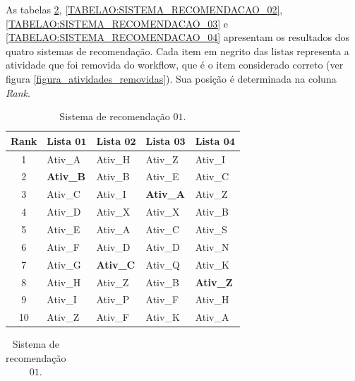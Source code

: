 As tabelas \ref{TABELAO:SISTEMA_RECOMENDACAO_01}, \ref{TABELAO:SISTEMA_RECOMENDACAO_02}, \ref{TABELAO:SISTEMA_RECOMENDACAO_03} e \ref{TABELAO:SISTEMA_RECOMENDACAO_04} apresentam os resultados dos quatro sistemas de recomendação. Cada item em negrito das listas representa a atividade que foi removida do workflow, que é o item considerado correto (ver figura \ref{figura_atividades_removidas}). Sua posição é determinada na coluna \emph{Rank}.
\begin{table}[!htbp]
\tiny
 \caption{Exemplo de recomendações de atividades usando quatro sistemas de recomendação.}
   \begin{subtable}{.5\linewidth}
    	\centering
   		\begin{tabular}{cllll} \hline 
   		\textbf{Rank} & \textbf{Lista} \(\mathbf{01}\) & \textbf{Lista} \(\mathbf{02}\) & \textbf{Lista} \(\mathbf{03}\) & \textbf{Lista} \(\mathbf{04}\) \\ \hline 
   		1                & Ativ\_A	     		& Ativ\_H    			& Ativ\_Z   		& Ativ\_I    		\\
   		2                & \textbf{Ativ\_B}		& Ativ\_B   			& Ativ\_E   		& Ativ\_C 			\\
   		3                & Ativ\_C    			& Ativ\_I    			& \textbf{Ativ\_A}  & Ativ\_Z  			\\
   		4                & Ativ\_D   			& Ativ\_X    			& Ativ\_X    		& Ativ\_B			\\
   		5                & Ativ\_E   			& Ativ\_A			 	& Ativ\_C    		& Ativ\_S			\\
   		6                & Ativ\_F   			& Ativ\_D    			& Ativ\_D    		& Ativ\_N			\\
   		7                & Ativ\_G   			& \textbf{Ativ\_C}  	& Ativ\_Q    		& Ativ\_K			\\
   		8                & Ativ\_H   			& Ativ\_Z    			& Ativ\_B   		& \textbf{Ativ\_Z}	\\
   		9                & Ativ\_I    			& Ativ\_P   			& Ativ\_F   		& Ativ\_H			\\
   		10               & Ativ\_Z   			& Ativ\_F    			& Ativ\_K    		& Ativ\_A			\\ \hline
   		\end{tabular}
   		\caption{Sistema de recomendação \(01\).}   
   		\label{TABELAO:SISTEMA_RECOMENDACAO_01}		
   \end{subtable}%
   \begin{subtable}{.5\linewidth}
   		\centering
   		\begin{tabular}{cllll} \hline 

\end{tabular}
\end{subtable}
\end{table}
